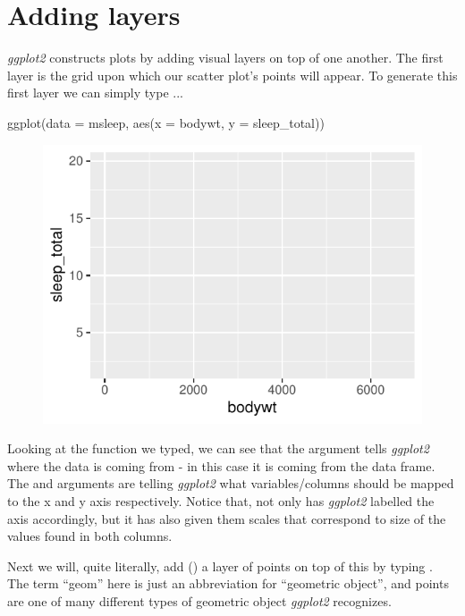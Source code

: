 \section{Adding layers}

\textit{ggplot2} constructs plots by adding visual layers on top of one another. The first layer is the grid upon which our scatter plot's points will appear.  To generate this first layer we can simply type ...

\begin{inR}
ggplot(data = msleep, aes(x = bodywt, y = sleep_total))
\end{inR}

\vspace{2em}

\begin{figure}[H]
\includegraphics[scale = 0.75]{graphics/ch2Figs/ggEx_1.pdf}
\label{fig:ggEx_1.pdf}
\end{figure}

\noindent
Looking at the  function we typed, we can see that the argument  tells \textit{ggplot2} where the data is coming from - in this case it is coming from the  data frame.  The  and  arguments are telling \textit{ggplot2} what variables/columns should be mapped to the x and y axis respectively.  Notice that, not only has \textit{ggplot2} labelled the axis accordingly, but it has also given them scales that correspond to size of the values found in both columns.

Next we will, quite literally, add (\R{+}) a layer of points on top of this by typing . The term ``geom'' here is just an abbreviation for ``geometric object'', and points are one of many different types of geometric object \textit{ggplot2} recognizes.

